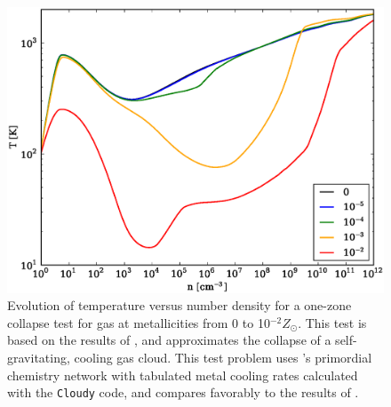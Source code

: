 \begin{figure}
  \begin{center}
    \includegraphics[width=1.0\textwidth]{figures/OneZoneCollapseTest.eps}
  \end{center}
  \caption{Evolution of temperature versus number density for a
one-zone collapse test for gas at metallicities from 0 to 10$^{-2}
Z_{\odot}$.  This test is based on the results of
\citet{2005ApJ...626..627O}, and approximates the collapse of a
self-gravitating, cooling gas cloud.  This test problem uses \enzo's
primordial chemistry network with tabulated metal cooling rates
calculated with the \texttt{Cloudy} code, and compares favorably to
the results of \citet{2005ApJ...626..627O}.}
  \label{fig.onezone}
\end{figure}
